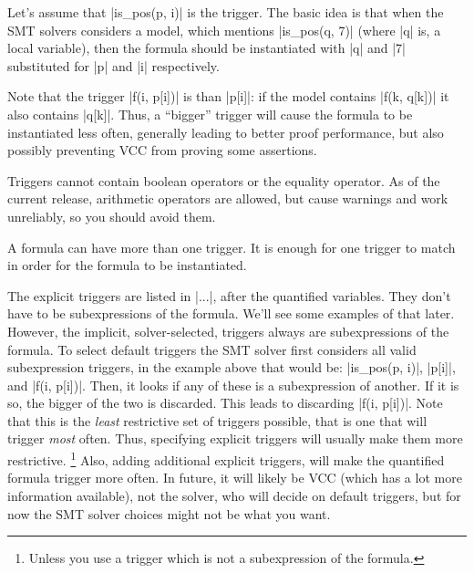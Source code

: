 Let's assume that \vcc|is_pos(p, i)| is the trigger. 
The basic idea is that when the SMT solvers considers a model,
which mentions \vcc|is_pos(q, 7)| (where \vcc|q| is, \eg a local variable), then the formula
should be instantiated with \vcc|q| and \vcc|7| substituted
for \vcc|p| and \vcc|i| respectively.

Note that the trigger \vcc|f(i, p[i])| is  than
\vcc|p[i]|: if the model contains \vcc|f(k, q[k])| it also contains \vcc|q[k]|.
Thus, a ``bigger'' trigger will cause the formula to be instantiated less often,
generally leading to better proof performance, but also possibly preventing
VCC from proving some assertions.

Triggers cannot contain boolean operators or the equality operator.
As of the current release, arithmetic operators are allowed, but cause warnings
and work unreliably, so you should avoid them.

A formula can have more than one trigger.
It is enough for one trigger to match in order for the formula
to be instantiated.

The explicit triggers are listed in \vcc|{...}|, after the quantified variables.
They don't have to be subexpressions of the formula. 
We'll see some examples of that later. 
However, the implicit, solver-selected, triggers always are subexpressions of the formula.
To select default triggers the SMT solver first considers all valid subexpression triggers,
in the example above that would be:
\vcc|is_pos(p, i)|, \vcc|p[i]|, and \vcc|f(i, p[i])|.
Then, it looks if any of these is a subexpression of another.
If it is so, the bigger of the two is discarded.
This leads to discarding \vcc|f(i, p[i])|.
Note that this is the \emph{least} restrictive set of
triggers possible, that is one that will trigger \emph{most} often.
Thus, specifying explicit triggers will usually make them more restrictive.%
\footnote{ Unless you use a trigger which is not a subexpression of the formula. }
Also, adding additional explicit triggers, will make the quantified formula trigger more often.
In future, it will likely be VCC (which has a lot more information available),
not the solver, who will decide on default triggers, but for now the SMT solver
choices might not be what you want.

